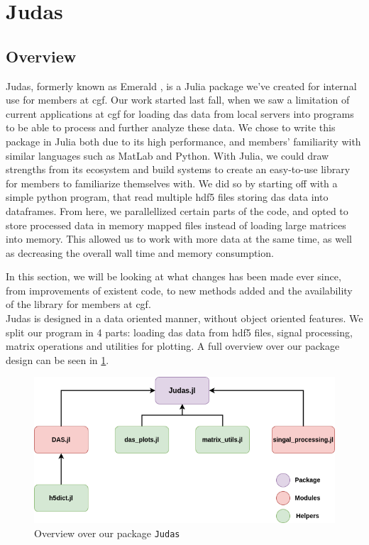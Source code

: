 \section{Judas}
\label{met:Judas}

\subsection{Overview}

Judas, formerly known as Emerald \cite{projthesis}, is a Julia package we've created for internal use for members at \acrshort{cgf}. Our work started last fall, when we saw a limitation of current applications at \acrshort{cgf} for loading \acrshort{das} data from local servers into programs to be able to process and further analyze these data. We chose to write this package in Julia both due to its high performance, and members' familiarity with similar languages such as MatLab and Python. With Julia, we could draw strengths from its ecosystem and build systems to create an easy-to-use library for members to familiarize themselves with. We did so by starting off with a simple python program, that read multiple \acrshort{hdf5} files storing \acrshort{das} data into dataframes. From here, we parallellized certain parts of the code, and opted to store processed data in memory mapped files instead of loading large matrices into memory. This allowed us to work with more data at the same time, as well as decreasing the overall wall time and memory consumption.  

In this section, we will be looking at what changes has been made ever since, from improvements of existent code, to new methods added and the availability of the library for members at \acrshort{cgf}. \\

Judas is designed in a data oriented manner, without object oriented features. We split our program in 4 parts: loading \acrshort{das} data from \acrshort{hdf5} files, signal processing, matrix operations and utilities for plotting. A full overview over our package design can be seen in \ref{fig:judasoverview}.\\

\begin{figure}[!h]
    \centering
    \includegraphics[scale=.6]{figures/judas_overview.png}
    \caption{Overview over our package \texttt{Judas}}
    \label{fig:judasoverview}
\end{figure}

